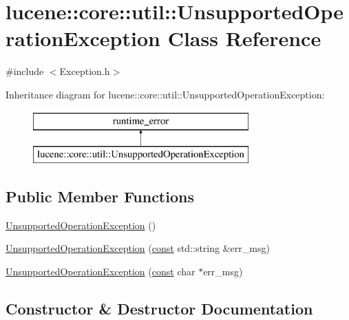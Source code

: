 \hypertarget{classlucene_1_1core_1_1util_1_1UnsupportedOperationException}{}\section{lucene\+:\+:core\+:\+:util\+:\+:Unsupported\+Operation\+Exception Class Reference}
\label{classlucene_1_1core_1_1util_1_1UnsupportedOperationException}


{\ttfamily \#include $<$Exception.\+h$>$}

Inheritance diagram for lucene\+:\+:core\+:\+:util\+:\+:Unsupported\+Operation\+Exception\+:\begin{figure}[H]
\begin{center}
\leavevmode
\includegraphics[height=2.000000cm]{classlucene_1_1core_1_1util_1_1UnsupportedOperationException}
\end{center}
\end{figure}
\subsection*{Public Member Functions}
\begin{DoxyCompactItemize}
\item 
\mbox{\hyperlink{classlucene_1_1core_1_1util_1_1UnsupportedOperationException_ac99d772154a2e9d90aa757a8ebff9f19}{Unsupported\+Operation\+Exception}} ()
\item 
\mbox{\hyperlink{classlucene_1_1core_1_1util_1_1UnsupportedOperationException_a8854fe79fd000a494f37be6346df0afe}{Unsupported\+Operation\+Exception}} (\mbox{\hyperlink{ZlibCrc32_8h_a2c212835823e3c54a8ab6d95c652660e}{const}} std\+::string \&err\+\_\+msg)
\item 
\mbox{\hyperlink{classlucene_1_1core_1_1util_1_1UnsupportedOperationException_a2100bef6538a583874d042173e230ae7}{Unsupported\+Operation\+Exception}} (\mbox{\hyperlink{ZlibCrc32_8h_a2c212835823e3c54a8ab6d95c652660e}{const}} char $\ast$err\+\_\+msg)
\end{DoxyCompactItemize}


\subsection{Constructor \& Destructor Documentation}
\mbox{\label{classlucene_1_1core_1_1util_1_1UnsupportedOperationException_ac99d772154a2e9d90aa757a8ebff9f19}} 
